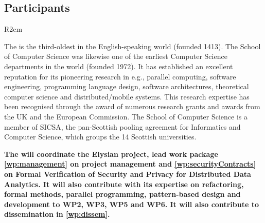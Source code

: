 \documentclass[a4paper,11pt]{article}
\newcommand{\project}[1]{\textbf{#1}\xspace}
\newcommand{\SECURITY}{\project{Elysian}}
\newcommand{\TheProject}{\SECURITY}
\begin{document}
\subsection{Participants}

\begin{wrapfigure}{R}{2cm}
\vspace{-3.95cm}
\hfill {}
\vspace{-1cm}
\end{wrapfigure}

\label{sec:participantUSTAN}

The \SAlong{} is the third-oldest in the English-speaking world (founded 1413).
The School of Computer Science was likewise one of the earliest Computer Science departments in the world (founded 1972).
It has established an excellent reputation for its pioneering research in e.g.,
parallel computing, software engineering, programming language design,
software architectures, theoretical computer science and
distributed/mobile systems.  This research expertise has been
recognised through the award of numerous research grants and
awards from the UK and the European Commission. The School of Computer Science is a member of SICSA, the pan-Scottish pooling agreement for Informatics and Computer Science, which groups the 14 Scottish universities.

\vspace{10pt}
\textbf{The \SAlong{} will coordinate the \TheProject{} project, lead work package \ref{wp:management} on project management and \ref{wp:securityContracts} on Formal Verification of Security and Privacy for Distributed Data Analytics. It will also contribute with its expertise on refactoring, formal methods, parallel programming, pattern-based design and development to WP2, WP3, WP5 and WP6. It will also contribute to dissemination in
\ref{wp:dissem}.}


\vspace{10pt}
\end{document}
